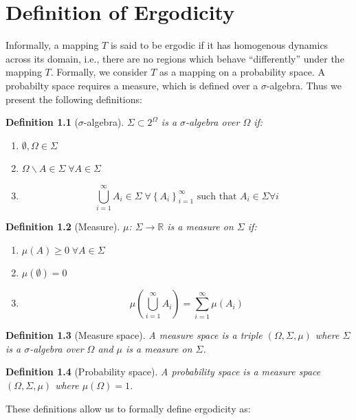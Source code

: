\documentclass{report}
\begin{document}
\appendix
\chapter{Definition of Ergodicity}
\label{sec:ergodicity}

Informally, a mapping $T$ is said to be ergodic if it has homogenous dynamics across its domain, i.e., there are no regions which behave ``differently'' under the mapping $T$. Formally, we consider $T$ as a mapping on a probability space. A probabilty space requires a measure, which is defined over a $\sigma$-algebra. Thus we present the following definitions:

\newtheorem{dfn}{Definition}
\begin{dfn}[$\sigma$-algebra]
$\Sigma \subset 2^{\Omega}$ is a \emph{$\sigma$-algebra} over $\Omega$ if:
\begin{enumerate}
\item
$\emptyset, \Omega \in \Sigma$
\item
$\Omega \backslash A \in \Sigma \; \forall A \in \Sigma$
\item
\[
\bigcup_{i=1}^{\infty}A_{i} \in \Sigma \; \forall \left\{A_{i}\right\}_{i=1}^{\infty}\text{ such that }A_{i} \in \Sigma \forall i
\]
\end{enumerate}
\end{dfn}

\begin{dfn}[Measure]
$\mu$: $\Sigma \rightarrow \mathbb{R}$ is a \emph{measure} on $\Sigma$ if:
\begin{enumerate}
\item
$\mu(A) \ge 0 \; \forall A \in \Sigma$
\item
$\mu(\emptyset) = 0$
\item
\[
\mu\left(\bigcup_{i=1}^{\infty} A_{i} \right) = \sum_{i=1}^{\infty} \mu(A_{i})
\]
\end{enumerate}
\end{dfn}

\begin{dfn}[Measure space]
A \emph{measure space} is a triple $(\Omega, \Sigma, \mu)$ where $\Sigma$ is a $\sigma$-algebra over $\Omega$ and $\mu$ is a measure on $\Sigma$.
\end{dfn}

\begin{dfn}[Probability space]
A \emph{probability space} is a measure space $(\Omega, \Sigma, \mu)$ where $\mu(\Omega) = 1$.
\end{dfn}

These definitions allow us to formally define ergodicity as:
\end{document}

